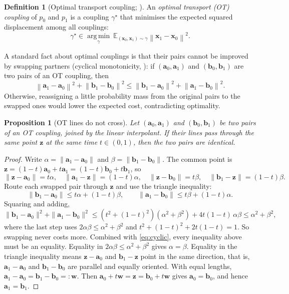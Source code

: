 \documentclass[11pt,a4paper]{article}
\numberwithin{equation}{section}     %
\theoremstyle{plain}        %
\newtheorem{proposition}[theorem]{Proposition}
\theoremstyle{definition}   %
\newtheorem{definition}[theorem]{Definition}
\theoremstyle{remark}       %
\begin{document}
\begin{definition}[Optimal transport coupling; \citealp{villani2009}]\label{def:ot}
An \emph{optimal transport (OT) coupling} of $p_0$ and $p_1$ is a coupling $\gamma^\star$ that minimises the expected squared displacement among all couplings:
\[
\gamma^\star\in\operatorname*{arg\,min}_{\gamma}\ \mathbb{E}_{(\mathbf{x}_0,\mathbf{x}_1)\sim\gamma}\left\|\mathbf{x}_1-\mathbf{x}_0\right\|^2 .
\]
\end{definition}

A standard fact about optimal couplings is that their pairs cannot be improved by swapping partners (cyclical monotonicity, \citealp[Ch.~5]{villani2009}): if $(\mathbf{a}_0,\mathbf{a}_1)$ and $(\mathbf{b}_0,\mathbf{b}_1)$ are two pairs of an OT coupling, then
\begin{equation}\label{eq:cyclic}
\left\|\mathbf{a}_1-\mathbf{a}_0\right\|^2+\left\|\mathbf{b}_1-\mathbf{b}_0\right\|^2\le\left\|\mathbf{b}_1-\mathbf{a}_0\right\|^2+\left\|\mathbf{a}_1-\mathbf{b}_0\right\|^2 .
\end{equation}
Otherwise, reassigning a little probability mass from the original pairs to the swapped ones would lower the expected cost, contradicting optimality.

\begin{proposition}[OT lines do not cross]\label{prop:nocross}
Let $(\mathbf{a}_0,\mathbf{a}_1)$ and $(\mathbf{b}_0,\mathbf{b}_1)$ be two pairs of an OT coupling, joined by the linear interpolant. If their lines pass through the same point $\mathbf{z}$ at the same time $t\in(0,1)$, then the two pairs are identical.
\end{proposition}

\begin{proof}
Write $\alpha=\|\mathbf{a}_1-\mathbf{a}_0\|$ and $\beta=\|\mathbf{b}_1-\mathbf{b}_0\|$. The common point is $\mathbf{z}=(1-t)\mathbf{a}_0+t\mathbf{a}_1=(1-t)\mathbf{b}_0+t\mathbf{b}_1$, so
\[
\|\mathbf{z}-\mathbf{a}_0\|=t\alpha,\quad\|\mathbf{a}_1-\mathbf{z}\|=(1-t)\alpha,\quad\|\mathbf{z}-\mathbf{b}_0\|=t\beta,\quad\|\mathbf{b}_1-\mathbf{z}\|=(1-t)\beta .
\]
Route each swapped pair through $\mathbf{z}$ and use the triangle inequality:
\[
\|\mathbf{b}_1-\mathbf{a}_0\|\le t\alpha+(1-t)\beta,\qquad\|\mathbf{a}_1-\mathbf{b}_0\|\le t\beta+(1-t)\alpha .
\]
Squaring and adding,
\[
\|\mathbf{b}_1-\mathbf{a}_0\|^2+\|\mathbf{a}_1-\mathbf{b}_0\|^2\le\left(t^2+(1-t)^2\right)(\alpha^2+\beta^2)+4t(1-t)\,\alpha\beta\le\alpha^2+\beta^2,
\]
where the last step uses $2\alpha\beta\le\alpha^2+\beta^2$ and $t^2+(1-t)^2+2t(1-t)=1$. So swapping never costs more. Combined with \eqref{eq:cyclic}, every inequality above must be an equality. Equality in $2\alpha\beta\le\alpha^2+\beta^2$ gives $\alpha=\beta$. Equality in the triangle inequality means $\mathbf{z}-\mathbf{a}_0$ and $\mathbf{b}_1-\mathbf{z}$ point in the same direction, that is, $\mathbf{a}_1-\mathbf{a}_0$ and $\mathbf{b}_1-\mathbf{b}_0$ are parallel and equally oriented. With equal lengths, $\mathbf{a}_1-\mathbf{a}_0=\mathbf{b}_1-\mathbf{b}_0=:\mathbf{w}$. Then $\mathbf{a}_0+t\mathbf{w}=\mathbf{z}=\mathbf{b}_0+t\mathbf{w}$ gives $\mathbf{a}_0=\mathbf{b}_0$, and hence $\mathbf{a}_1=\mathbf{b}_1$.
\end{proof}
\end{document}
